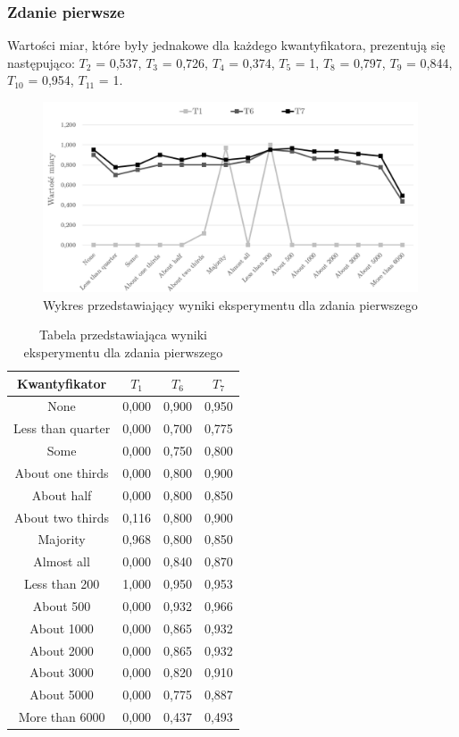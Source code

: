 \documentclass{classrep}
\begin{document}
\clearpage



\subsubsection{Zdanie pierwsze}

Wartości miar, które były jednakowe dla każdego kwantyfikatora, prezentują się następująco:
$T_2$ = 0,537, $T_3$ = 0,726, $T_4$ = 0,374, $T_5$ = 1, $T_8$ = 0,797, $T_9$ = 0,844, $T_{10}$ = 0,954, $T_{11}$ = 1.

\begin{figure}[H]
	\centering
	\includegraphics[width=0.99\textwidth]{Pictures/ResultCharts/Eks1_1.png}
	\caption{Wykres przedstawiający wyniki eksperymentu dla zdania pierwszego}
\end{figure}

\begin{table}[H]
	\centering
	\begin{tabular}{c c c c} 
		\hline
		\textbf{Kwantyfikator}  & \textbf{$T_1$} & \textbf{$T_6$} & \textbf{$T_7$}\\ [0.5ex] 
		\hline
None	&	0,000	&	0,900	&	0,950	\\
Less than quarter	&	0,000	&	0,700	&	0,775	\\
Some 	&	0,000	&	0,750	&	0,800	\\
About one thirds 	&	0,000	&	0,800	&	0,900	\\
About half 	&	0,000	&	0,800	&	0,850	\\
About two thirds 	&	0,116	&	0,800	&	0,900	\\
Majority 	&	0,968	&	0,800	&	0,850	\\
Almost all	&	0,000	&	0,840	&	0,870	\\
Less than 200	&	1,000	&	0,950	&	0,953	\\
About 500	&	0,000	&	0,932	&	0,966	\\
About 1000	&	0,000	&	0,865	&	0,932	\\
About 2000	&	0,000	&	0,865	&	0,932	\\
About 3000	&	0,000	&	0,820	&	0,910	\\
About 5000	&	0,000	&	0,775	&	0,887	\\
More than 6000	&	0,000	&	0,437	&	0,493	\\
		\hline
	\end{tabular}
	\caption{Tabela przedstawiająca wyniki eksperymentu dla zdania pierwszego}
\end{table}
\end{document}

